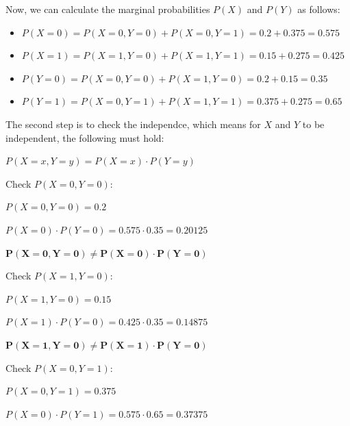 \documentclass[12pt,letterpaper, onecolumn]{exam}
\begin{document}
\begin{questions}
\begin{parts}
\begin{subparts}
\begin{solution}
                Now, we can calculate the marginal probabilities $P(X)$ and $P(Y)$ as follows:

                \begin{itemize}
                    \item $P(X=0) = P(X=0,Y=0) + P(X=0,Y=1) = 0.2 + 0.375 = 0.575$
                    \item $P(X=1) = P(X=1,Y=0) + P(X=1,Y=1) = 0.15 + 0.275 = 0.425$
                    \item $P(Y=0) = P(X=0,Y=0) + P(X=1,Y=0) = 0.2 + 0.15 = 0.35$
                    \item $P(Y=1) = P(X=0,Y=1) + P(X=1,Y=1) = 0.375 + 0.275 = 0.65$
                \end{itemize}

                The second step is to check the independce, which means for $X$ and $Y$ to be independent, the following must hold:

                \begin{center}
                    $\displaystyle{P(X=x,Y=y) = P(X=x) \cdot P(Y=y)}$
                \end{center}
                
                Check $P(X=0,Y=0)$:

                \begin{center}
                    $P(X=0,Y=0) = 0.2$

                    $P(X=0) \cdot P(Y=0) = 0.575 \cdot 0.35 = 0.20125$

                    $\boldsymbol{P(X=0,Y=0) \neq P(X=0) \cdot P(Y=0)}$
                \end{center}

                Check $P(X=1,Y=0)$:

                \begin{center}
                    $P(X=1,Y=0) = 0.15$

                    $P(X=1) \cdot P(Y=0) = 0.425 \cdot 0.35 = 0.14875$

                    $\boldsymbol{P(X=1,Y=0) \neq P(X=1) \cdot P(Y=0)}$
                \end{center}

                Check $P(X=0,Y=1)$:

                \begin{center}
                    $P(X=0,Y=1) = 0.375$

                    $P(X=0) \cdot P(Y=1) = 0.575 \cdot 0.65 = 0.37375$


\end{center}
\end{solution}
\end{subparts}
\end{parts}
\end{questions}
\end{document}
